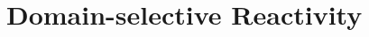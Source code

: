 \documentclass[12pt,%
              twoside,
               letterpaper]{uiothesis}
\begin{document}




\section{Domain-selective Reactivity}
\label{subsec:ch6domain}
\end{document}
